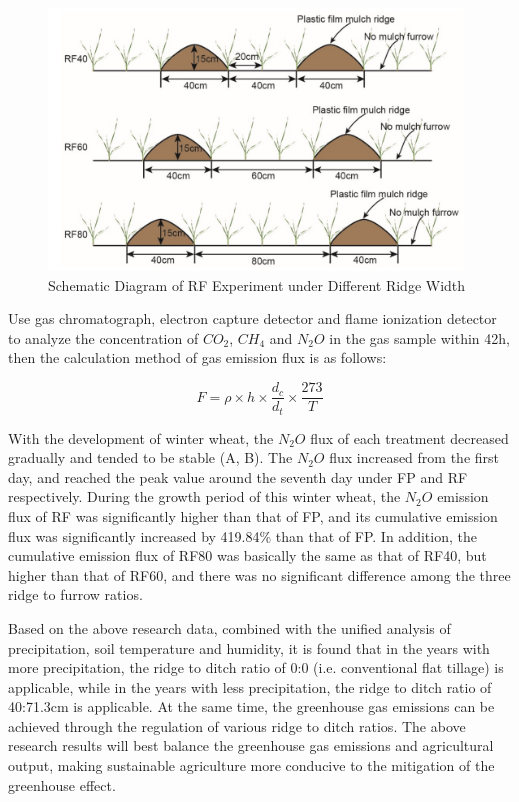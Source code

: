 \documentclass{apmcmthesis}
\begin{document}
\begin{figure} 
    \centering
    \includegraphics[width=11cm]{APMCMThesis/figures/tu4.png}
    \caption{Schematic Diagram of RF Experiment under Different Ridge Width}
\label{width}
\end{figure}

Use gas chromatograph, electron capture detector and flame ionization detector to analyze the concentration of $CO_2$, $CH_4$ and $N_2O$ in the gas sample within 42h, then the calculation method of gas emission flux is as follows:

$$F=\rho \times h \times \frac{d_{c}}{d_{t}} \times \frac{273}{T}$$





With the development of winter wheat, the $N_2O$ flux of each treatment decreased gradually and tended to be stable (A, B). The $N_2O$ flux increased from the first day, and reached the peak value around the seventh day under FP and RF respectively. During the growth period of this winter wheat, the $N_2O$ emission flux of RF was significantly higher than that of FP, and its cumulative emission flux was significantly increased by 419.84$\%$ than that of FP. In addition, the cumulative emission flux of RF80 was basically the same as that of RF40, but higher than that of RF60, and there was no significant difference among the three ridge to furrow ratios.

Based on the above research data, combined with the unified analysis of precipitation, soil temperature and humidity, it is found that in the years with more precipitation, the ridge to ditch ratio of 0:0 (i.e. conventional flat tillage) is applicable, while in the years with less precipitation, the ridge to ditch ratio of 40:71.3cm is applicable. At the same time, the greenhouse gas emissions can be achieved through the regulation of various ridge to ditch ratios. The above research results will best balance the greenhouse gas emissions and agricultural output, making sustainable agriculture more conducive to the mitigation of the greenhouse effect.
\end{document}
